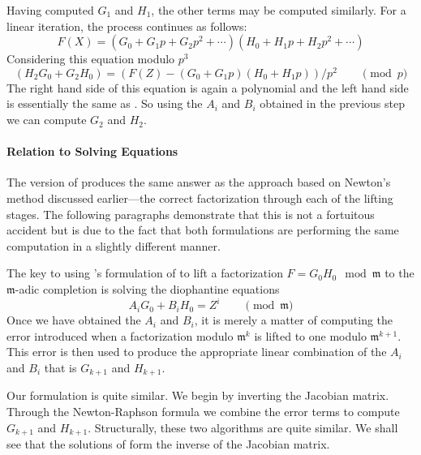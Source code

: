 Having computed $G_1$ and $H_1$, the other terms may be computed
similarly.  For a linear iteration, the process continues as follows:
\[
F(X) = (G_0 + G_1 p + G_2 p^2 + \cdots) 
(H_0 + H_1 p + H_2 p^2 + \cdots)
\]
Considering this equation modulo $p^3$
\[
(H_2 G_0 + G_2 H_0) = \left( F(Z) - 
  (G_0 + G_1 p)(H_0 + H_1 p) \right) / p^2 \qquad \pmod{p}
\]
The right hand side of this equation is again a polynomial and the
left hand side is essentially the same as .  So
using the $A_i$ and $B_i$ obtained in the previous step we can compute
$G_2$ and $H_2$.

\paragraph{Relation to Solving Equations}

The {\Zassenhaus} version of  produces the same 
answer as the approach based on Newton's method discussed earlier---the 
correct factorization through each of the lifting stages.  The
following paragraphs demonstrate that this is not a fortuitous
accident but is due to the fact that both formulations are performing
the same computation in a slightly different manner.

The key to using {\Zassenhaus}'s formulation of  to 
lift a factorization $F = G_0 H_0 \mod{\mathfrak{m}}$ to the $\mathfrak{
m}$-adic completion is solving the diophantine equations
\begin{equation} \label{Hensel:ZassDio:Eq}
A_i G_0 + B_i H_0 = Z^i \qquad\pmod{\mathfrak{m}}
\end{equation}
Once we have obtained the $A_i$ and $B_i$, it is merely a matter of
computing the error introduced when a factorization modulo $\mathfrak{m}^k$ 
is lifted to one modulo $\mathfrak{m}^{k+1}$.
This error is then used to produce the appropriate linear combination of the
$A_i$ and $B_i$ that is $G_{k+1}$ and  $H_{k+1}$.

Our formulation is quite similar.  We begin by inverting the Jacobian
matrix.  Through the Newton-Raphson formula we combine the error terms
to compute $G_{k+1}$ and $H_{k+1}$.  Structurally, these two algorithms 
are quite similar.  We shall see that the solutions of 
 form the inverse of the Jacobian matrix.

